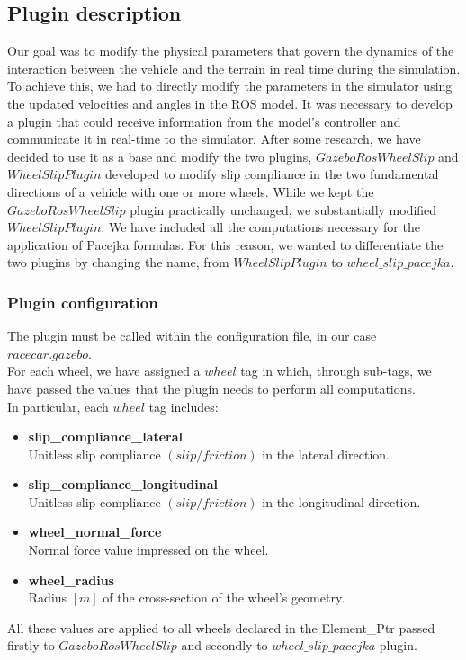 \subsection{Plugin description}

Our goal was to modify the physical parameters that govern the dynamics of the interaction between the vehicle and the terrain in real time during the simulation.
To achieve this, we had to directly modify the parameters in the simulator using the updated velocities and angles in the ROS model. It was necessary to develop a plugin that could receive information from the model's controller and communicate it in real-time to the simulator.
After some research, we have decided to use it as a base and modify the two plugins, $GazeboRosWheelSlip$ and $WheelSlipPlugin$ developed to modify slip compliance in the two fundamental directions of a vehicle with one or more wheels.
While we kept the $GazeboRosWheelSlip$ plugin practically unchanged, we substantially modified $WheelSlipPlugin$. We have included all the computations necessary for the application of Pacejka formulas. For this reason, we wanted to differentiate the two plugins by changing the name, from $WheelSlipPlugin$ to $wheel\_slip\_pacejka$.

\subsubsection{Plugin configuration}
The plugin must be called within the configuration file, in our case $racecar.gazebo$.\\
For each wheel, we have assigned a $wheel$ tag in which, through sub-tags, we have passed the values that the plugin needs to perform all computations. \\
In particular, each $wheel$ tag includes:
\begin{itemize}
	\item \textbf{slip\_compliance\_lateral} \\
		  Unitless slip compliance $(slip / friction)$ in the lateral direction. 
	\item \textbf{slip\_compliance\_longitudinal} \\
		  Unitless slip compliance $(slip / friction)$ in the longitudinal direction. 
	\item \textbf{wheel\_normal\_force} \\
		  Normal force value impressed on the wheel.
	\item \textbf{wheel\_radius} \\
		  Radius $[m]$ of the cross-section of the wheel's geometry.
\end{itemize}
All these values are applied to all wheels declared in the Element\_Ptr passed firstly to $GazeboRosWheelSlip$ and secondly to $wheel\_slip\_pacejka$ plugin.


